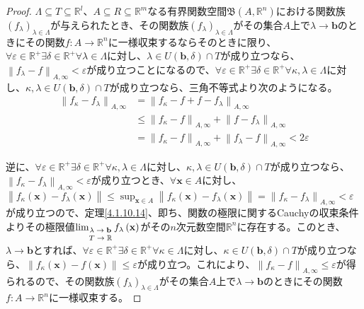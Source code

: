 \documentclass[dvipdfmx]{jsarticle}
\begin{document}
\begin{proof}
$\varLambda \subseteq T \subseteq \mathbb{R}^{l}$、$A \subseteq R \subseteq \mathbb{R}^{m}$なる有界関数空間$\mathfrak{B}\left( A,\mathbb{R}^{n} \right)$における関数族$\left( f_{\lambda} \right)_{\lambda \in \varLambda}$が与えられたとき、その関数族$\left( f_{\lambda} \right)_{\lambda \in \varLambda}$がその集合$A$上で$\lambda \rightarrow \mathbf{b}$のときにその関数$f:A \rightarrow \mathbb{R}^{n}$に一様収束するならそのときに限り、$\forall\varepsilon \in \mathbb{R}^{+}\exists\delta \in \mathbb{R}^{+}\forall\lambda \in \varLambda$に対し、$\lambda \in U\left( \mathbf{b},\delta \right) \cap T$が成り立つなら、$\left\| f_{\lambda} - f \right\|_{A,\infty} < \varepsilon$が成り立つことになるので、$\forall\varepsilon \in \mathbb{R}^{+}\exists\delta \in \mathbb{R}^{+}\forall\kappa,\lambda \in \varLambda$に対し、$\kappa,\lambda \in U\left( \mathbf{b},\delta \right) \cap T$が成り立つなら、三角不等式より次のようになる。
\begin{align*}
\left\| f_{\kappa} - f_{\lambda} \right\|_{A,\infty} &= \left\| f_{\kappa} - f + f - f_{\lambda} \right\|_{A,\infty}\\
&\leq \left\| f_{\kappa} - f \right\|_{A,\infty} + \left\| f - f_{\lambda} \right\|_{A,\infty}\\
&= \left\| f_{\kappa} - f \right\|_{A,\infty} + \left\| f_{\lambda} - f \right\|_{A,\infty} < 2\varepsilon
\end{align*}\par
逆に、$\forall\varepsilon \in \mathbb{R}^{+}\exists\delta \in \mathbb{R}^{+}\forall\kappa,\lambda \in \varLambda$に対し、$\kappa,\lambda \in U\left( \mathbf{b},\delta \right) \cap T$が成り立つなら、$\left\| f_{\kappa} - f_{\lambda} \right\|_{A,\infty} < \varepsilon$が成り立つとき、$\forall\mathbf{x} \in A$に対し、$\left\| f_{\kappa}\left( \mathbf{x} \right) - f_{\lambda}\left( \mathbf{x} \right) \right\| \leq \sup_{\mathbf{x} \in A}\left\| f_{\kappa}\left( \mathbf{x} \right) - f_{\lambda}\left( \mathbf{x} \right) \right\| = \left\| f_{\kappa} - f_{\lambda} \right\|_{A,\infty} < \varepsilon$が成り立つので、定理\ref{4.1.10.14}、即ち、関数の極限に関するCauchyの収束条件よりその極限値$\lim_{\scriptsize \begin{matrix} \lambda \rightarrow \mathbf{b} \\ T \rightarrow \mathbb{R} \end{matrix}}{f_{\lambda}\left( \mathbf{x} \right)}$がその$n$次元数空間$\mathbb{R}^{n}$に存在する。このとき、$\lambda \rightarrow \mathbf{b}$とすれば、$\forall\varepsilon \in \mathbb{R}^{+}\exists\delta \in \mathbb{R}^{+}\forall\kappa \in \varLambda$に対し、$\kappa \in U\left( \mathbf{b},\delta \right) \cap T$が成り立つなら、$\left\| f_{\kappa}\left( \mathbf{x} \right) - f\left( \mathbf{x} \right) \right\| \leq \varepsilon$が成り立つ。これにより、$\left\| f_{\kappa} - f \right\|_{A,\infty} \leq \varepsilon$が得られるので、その関数族$\left( f_{\lambda} \right)_{\lambda \in \varLambda}$がその集合$A$上で$\lambda \rightarrow \mathbf{b}$のときにその関数$f:A \rightarrow \mathbb{R}^{n}$に一様収束する。
\end{proof}
\end{document}
